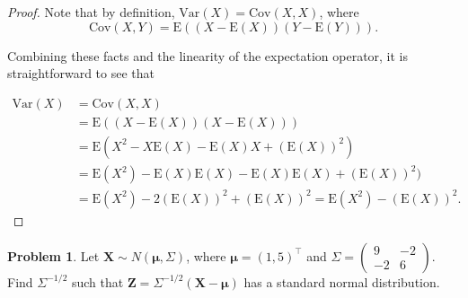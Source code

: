 \documentclass[12pt]{article}
\theoremstyle{definition}
\newtheorem{problem}{Problem}
\newcommand{\E}{\text{E}}
\newcommand{\V}{\text{Var}}
\newcommand{\vect}[1]{\boldsymbol{#1}}
\begin{document}
\begin{proof}
  Note that by definition, $\V(X) = \text{Cov}(X, X)$, where
  \[
    \text{Cov}(X, Y) = \E((X - \E(X))(Y - \E(Y))).
  \]

  Combining these facts and the linearity of the expectation operator, it is
  straightforward to see that

  \begin{align*}
    \V(X)
    &= \text{Cov}(X, X) \\
    &= \E((X - \E(X))(X - \E(X))) \\
    &= \E(X^2 - X\E(X) - \E(X)X + (\E(X))^2) \\
    &= \E(X^2) - \E(X)\E(X) - \E(X)\E(X) + (\E(X))^2) \\
    &= \E(X^2) - 2(\E(X))^2 + (\E(X))^2 = \E(X^2) - (\E(X))^2.
  \end{align*}
\end{proof}


\begin{problem}
  Let $\vect{X} \sim N(\vect{\mu}, \Sigma)$, where $\vect{\mu} =  (1, 5)^\intercal$
  and $\Sigma = \left ( \begin{matrix} 9 & -2 \\ -2 & 6 \end{matrix} \right).$ Find
  $\Sigma^{-1/2}$ such that $\vect{Z} = \Sigma^{-1/2}(\vect{X} - \vect{\mu})$ has
  a standard normal distribution.
\end{problem}
\end{document}
